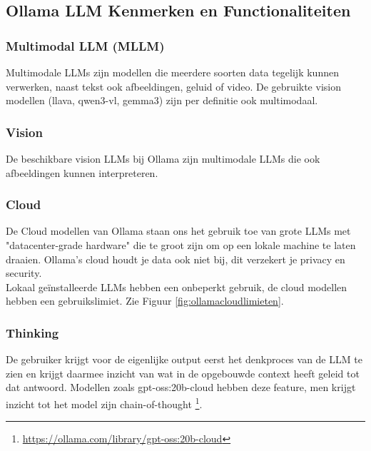 \subsection{Ollama LLM Kenmerken en Functionaliteiten}
\label{ssec:ollamallmkenmerkenenfunctionaliteiten}

\subsubsection{Multimodal LLM (MLLM)}
\label{sssec:multimodalllmmllm}
Multimodale LLMs zijn modellen die meerdere soorten data tegelijk kunnen verwerken, naast tekst ook afbeeldingen, geluid of video. \autocite{Varughese}
De gebruikte vision modellen (llava, qwen3-vl, gemma3) zijn per definitie ook multimodaal.


\subsubsection{Vision}
\label{sssec:vision2}
De beschikbare vision LLMs bij Ollama zijn multimodale LLMs die ook afbeeldingen kunnen interpreteren.

\subsubsection{Cloud}
\label{sssec:cloud}
De Cloud modellen van Ollama staan ons het gebruik toe van grote LLMs met "datacenter-grade hardware" die te groot zijn om op een lokale machine te laten draaien. Ollama's cloud houdt je data ook niet bij, dit verzekert je privacy en security. \autocite{Ollama2025} \\

Lokaal geïnstalleerde LLMs hebben een onbeperkt gebruik, de cloud modellen hebben een gebruikslimiet. Zie Figuur \ref{fig:ollamacloudlimieten}.

\subsubsection{Thinking}
\label{sssec:thinking}
De gebruiker krijgt voor de eigenlijke output eerst het denkproces van de LLM te zien en krijgt daarmee inzicht van wat in de opgebouwde context heeft geleid tot dat antwoord. Modellen zoals gpt-oss:20b-cloud hebben deze feature, men krijgt inzicht tot het model zijn chain-of-thought \footnote{\href{https://ollama.com/library/gpt-oss:20b-cloud}{https://ollama.com/library/gpt-oss:20b-cloud}}.

